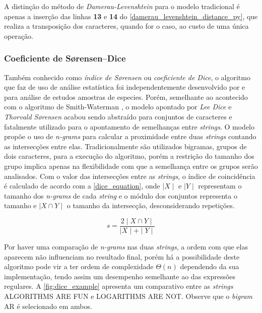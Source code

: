 A distinção do método de \textit{Damerau-Levenshtein} para o modelo tradicional é apenas a inserção das linhas \textbf{13} e \textbf{14} do \autoref{damerau_levenshtein_distance_py}, que realiza a transposição dos caracteres, quando for o caso, ao custo de uma única operação.

\subsubsection*{Coeficiente de Sørensen–Dice} %
\label{ssub:s_rensen_dice_coefficient}

Também conhecido como \textit{índice de Sørensen} ou \textit{coeficiente de Dice}, o algoritmo que faz de uso de análise estatística foi independentemente desenvolvido por  e  para análise  de estudos amostras de especies. Porém, semelhante ao acontecido com o algoritmo de Smith-Waterman \cite{smith1981identification}, o modelo apontado por \textit{Lee Dice} e \textit{Thorvald Sørensen} acabou sendo abstraído para conjuntos de caracteres e fatalmente utilizado para o apontamento de semelhanças entre \textit{strings}. O modelo propõe o uso de \textit{n-grams} \cite{cavnar1994n} para calcular a proximidade entre duas \textit{strings} contando as intersecções entre elas. Tradicionalmente são utilizados bigramas, grupos de dois caracteres, para a execução do algoritmo, porém a restrição do tamanho dos grupo implica apenas na flexibilidade com que a semelhança entre os grupos serão analisados. Com o valor das intersecções entre as \textit{strings}, o índice de coincidência é calculado de acordo com a \autoref{dice_equation}, onde $\mid X\mid$ e $\mid Y\mid$ representam o tamanho dos \textit{n-grams} de cada \textit{string} e o módulo dos conjuntos representa o tamanho e $\mid X\cap Y\mid$ o tamanho da intersecção, desconsiderando repetições.

\begin{equation}\label{dice_equation}
  s = \frac{2\mid X\cap Y\mid}{\mid X\mid+\mid Y\mid}
\end{equation}

Por haver uma comparação de \textit{n-grams} nas duas \textit{strings}, a ordem com que elas aparecem não influenciam no resultado final, porém  há a possibilidade deste algoritmo pode vir a ter ordem de complexidade $\Theta(n)$ dependendo da sua implementação, tendo assim um desempenho semelhante ao das expressões regulares. A \autoref{fig:dice_example} apresenta um comparativo entre as \textit{strings} {\code ALGORITHMS ARE FUN} e {\code LOGARITHMS ARE NOT}. Observe que o \textit{bigram} {\code AR} é selecionado em ambos.


